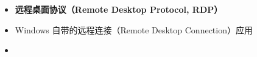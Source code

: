 
\begin{issues}
\issueDraft
\end{issues}

\begin{itemize}
\item \textbf{远程桌面协议（Remote Desktop Protocol, RDP）}
\item Windows 自带的远程连接（Remote Desktop Connection）应用
\item 
\end{itemize}

